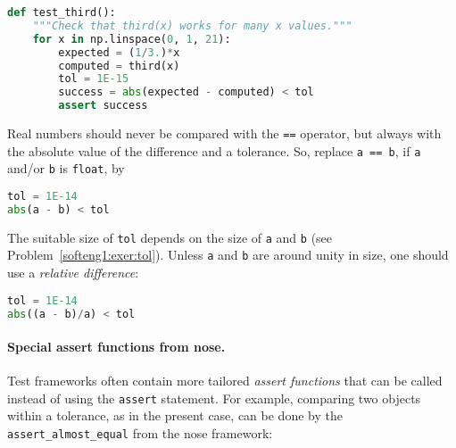 \documentclass[graybox,sectrefs,envcountresetchap,open=right,final]{svmonodo}
\newenvironment{notice_mdfboxadmon}[1][]{
\begin{notice_mdfboxmdframed}[frametitle=#1]
}
{
\end{notice_mdfboxmdframed}
}
\begin{document}
\begin{lstlisting}[language=python,style=blue1_bluegreen]
def test_third():
    """Check that third(x) works for many x values."""
    for x in np.linspace(0, 1, 21):
        expected = (1/3.)*x
        computed = third(x)
        tol = 1E-15
        success = abs(expected - computed) < tol
        assert success

\end{lstlisting}




\begin{notice_mdfboxadmon}
Real numbers should never be compared with the \texttt{==} operator, but always
with the absolute value of the difference and a tolerance.
So, replace \texttt{a == b}, if \texttt{a} and/or \texttt{b} is \texttt{float}, by




\begin{lstlisting}[language=python,style=blue1_bluegreen]
tol = 1E-14
abs(a - b) < tol

\end{lstlisting}

The suitable size of \texttt{tol} depends on the size of \texttt{a} and \texttt{b}
(see Problem~\ref{softeng1:exer:tol}). Unless \texttt{a} and \texttt{b} are around
unity in size, one should use a \emph{relative difference}:




\begin{lstlisting}[language=python,style=blue1_bluegreen]
tol = 1E-14
abs((a - b)/a) < tol

\end{lstlisting}
\end{notice_mdfboxadmon} %



\paragraph{Special assert functions from nose.}
Test frameworks often contain more tailored
\emph{assert functions} that can be called instead of using the \texttt{assert}
statement. For example, comparing two objects within
a tolerance, as in the present
case, can be done by the \Verb!assert_almost_equal! from the nose
framework:
\end{document}
